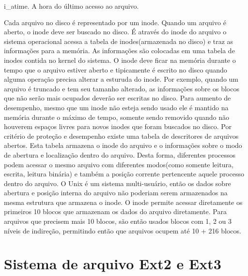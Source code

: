 i_atime. A hora do último acesso ao arquivo.

Cada arquivo no disco é representado por um inode. Quando um arquivo é aberto, o inode deve ser buscado no disco. 
É através do inode do arquivo o sistema operacional acessa a tabela de inodes(armazenada no disco) e traz as informações para a memória. As informações são colocadas em uma tabela de inodes contida no kernel do sistema. 
O inode deve ficar na memória durante o tempo que o arquivo estiver aberto e tipicamente é escrito no disco quando alguma operação precisa alterar a esturuda do inode. Por exemplo, quando um arquivo é truncado e tem seu tamanho alterado, as informações sobre os blocos que não serão mais ocupados deverão ser escritas no disco. Para aumento de desempenho, mesmo que um inode não esteja sendo usado ele é mantido na memória durante o máximo de tempo, somente sendo removido quando não houverem espaços livres para novos inodes que foram buscados no disco.
Por critério de proteção e desempenho existe uma tabela de descritores de arquivos abertos. Esta tabela armazena o inode do arquivo e o informações sobre o modo de abertura e localização dentro do arquivo. Desta forma, diferentes processos podem acessar o mesmo arquivo com diferentes modos(como somente leitura, escrita, leitura binária) e também a posição corrente pertencente aquele processo dentro do arquivo. O Unix é um sistema multi-usuário, então os dados sobre abertura e posição interna do arquivo não poderiam serem armazenados na mesma estrutura que armazena o inode.
O inode permite acessar diretamente os primeiros 10 blocos que armazenam os dados do arquivo diretamente. Para arquivos que precisem mais 10 blocos, são então usados blocos com 1, 2 ou 3 níveis de indireção, permitindo então que arquivos ocupem até 10 + 216 blocos.




\section{Sistema de arquivo Ext2 e Ext3}

